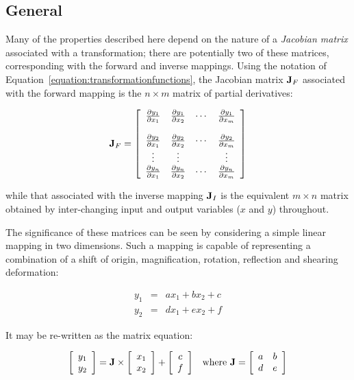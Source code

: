 \subsection{General}

Many of the properties described here depend on the nature of a {\em
Jacobian matrix} associated with a transformation; there are potentially two
of these matrices, corresponding with the forward and inverse mappings. 
Using the notation of Equation~\ref{equation:transformationfunctions}, the
Jacobian matrix ${\bf J}_F$ associated with the forward mapping is the
\mbox{$n \times m$} matrix of partial derivatives: 

\begin{equation}
{\bf J}_F = \left[ \begin{array}{cccc}
\frac{\partial y_{1}}{\partial x_{1}} & \frac{\partial y_{1}}{\partial x_{2}} & \cdots & \frac{\partial y_{1}}{\partial x_{m}} \\
             &              &        &              \\
\frac{\partial y_{2}}{\partial x_{1}} & \frac{\partial y_{2}}{\partial x_{2}} & \cdots & \frac{\partial y_{2}}{\partial x_{m}} \\
\vdots       & \vdots       &        & \vdots       \\
\frac{\partial y_{n}}{\partial x_{1}} & \frac{\partial y_{n}}{\partial x_{2}} & \cdots & \frac{\partial y_{n}}{\partial x_{m}}
\end{array} \right]
\end{equation}

while that associated with the inverse mapping ${\bf J}_I$ is the equivalent
\mbox{$m \times n$} matrix obtained by inter-changing input and output
variables ($x$ and $y$) throughout. 

The significance of these matrices can be seen by considering a simple
linear mapping in two dimensions.
Such a mapping is capable of representing a combination of a shift of
origin, magnification, rotation, reflection and shearing deformation: 

\begin{equation}
\begin{array}{lll}
y_1 & = & a x_1 + b x_2 + c \\
y_2 & = & d x_1 + e x_2 + f
\end{array}
\end{equation}

It may be re-written as the matrix equation: 

\begin{equation}
\begin{array}{cc}
\left[ \begin{array}{c} y_1 \\ y_2 \end{array} \right]
= {\bf J} \times \left[ \begin{array}{c} x_1 \\ x_2 \end{array} \right]
+ \left[ \begin{array}{c} c \\ f \end{array} \right]
&
\mbox{where }
{\bf J} = \left[ \begin{array}{cc} a & b \\ d & e \end{array} \right]
\end{array}
\end{equation}

